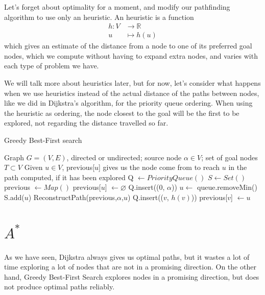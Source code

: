 \documentclass[12pt]{report}
\newtheorem{definition}[theorem]{Definition}
\begin{document}
Let's forget about optimality for a moment, and modify our pathfinding algorithm to use only an heuristic. An heuristic is a function
\begin{align*}
	h \colon V &\to \mathbb{R}\\
	u &\mapsto h(u)
\end{align*}
which gives an estimate of the distance from a node to one of its preferred goal nodes, which we compute without having to expand extra nodes, and varies with each type of problem we have.

We will talk more about heuristics later, but for now, let's consider what happens when we use heuristics instead of the actual distance of the paths between nodes, like we did in Dijkstra's algorithm, for the priority queue ordering. When using the heuristic as ordering, the node closest to the goal will be the first to be explored, not regarding the distance travelled so far.

\begin{algorithm}
\caption{Greedy Best-First search}
\label{alg:greedy}
\begin{algorithmic}[1]
\Require Graph $G = (V, E)$, directed or undirected; source node $\alpha \in V$; set of goal nodes $T \subset V$
\Ensure Given $u \in V$, previous[$u$] gives us the node come from to reach $u$ in the path computed, if it has been explored
\State Q $\gets PriorityQueue()$
\State $S \gets Set()$
\State previous $\gets Map()$
	\State previous[$u$] $\gets \varnothing$
\EndFor
\State Q.insert((0, $\alpha$))
	\State $u \gets$ queue.removeMin()
	\State S.add($u$)
	 
		\State \Return ReconstructPath(previous,$\alpha$,$u$)
	\EndIf
			\Continue
		\EndIf
		\State Q.insert(($v$, $h(v)$))
		\State previous[$v$] $\gets u$
	\EndFor
\EndWhile
\EndProcedure
\end{algorithmic}
\end{algorithm}



\section{$A^*$}
\label{section:astar}
As we have seen, Dijkstra always gives us optimal paths, but it wastes a lot of time exploring a lot of nodes that are not in a promising direction. On the other hand, Greedy Best-First Search explores nodes in a promising direction, but does not produce optimal paths reliably.
\end{document}
